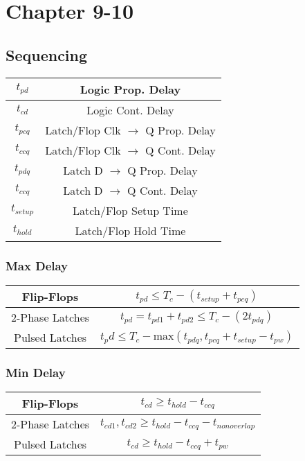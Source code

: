 \section{Chapter 9-10}
    \subsection{Sequencing}
    \begin{tabular}{| c | c |}
        \hline
        $t_{pd}$ & Logic Prop. Delay \\
        \hline
        $t_{cd}$ & Logic Cont. Delay \\
        \hline
        $t_{pcq}$ & Latch/Flop Clk $\xrightarrow{}$ Q Prop. Delay \\
        \hline
        $t_{ccq}$ & Latch/Flop Clk $\xrightarrow{}$ Q Cont. Delay \\
        \hline
        $t_{pdq}$ & Latch D $\xrightarrow{}$ Q Prop. Delay \\
        \hline
        $t_{ccq}$ & Latch D $\xrightarrow{}$ Q Cont. Delay \\
        \hline
        $t_{setup}$ & Latch/Flop Setup Time \\
        \hline
        $t_{hold}$ & Latch/Flop Hold Time \\
        \hline
    \end{tabular}
        \subsubsection{Max Delay}
        \begin{tabular}{| c | c |}
            \hline
            Flip-Flops & $t_{pd} \leq T_c - (t_{setup} + t_{pcq})$ \\
            \hline
            2-Phase Latches & $t_{pd} = t_{pd1} + t_{pd2} \leq T_c - (2t_{pdq})$ \\
            \hline
            Pulsed Latches & $t_pd \leq T_c - \text{max}\left( t_{pdq}, t_{pcq} + t_{setup} - t_{pw}\right)$ \\
            \hline
        \end{tabular}

        \subsubsection{Min Delay}
        \begin{tabular}{| c | c |}
            \hline
            Flip-Flops & $t_{cd} \geq t_{hold} - t_{ccq}$ \\
            \hline
            2-Phase Latches & $t_{cd1},t_{cd2} \geq t_{hold} - t_{ccq} - t_{nonoverlap}$ \\
            \hline
            Pulsed Latches & $t_{cd} \geq t_{hold} - t_{ccq} + t_{pw}$ \\
            \hline
        \end{tabular}

